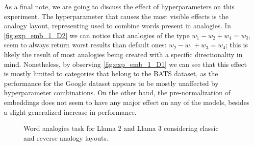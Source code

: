 As a final note, we are going to discuss the effect of hyperparameters on this experiment.
The hyperparameter that causes the most visible effects is the analogy layout, representing  used to combine words present in analogies.
In \cref{fig:exp_emb_1_D2} we can notice that analogies of the type $w_1 - w_2 + w_4 = w_3$, seem to always return worst results than default ones: $w_2 - w_1 + w_3 = w_4$; this is likely the result of most analogies being created with a specific directionality in mind.
Nonetheless, by observing \cref{fig:exp_emb_1_D1} we can see that this effect is mostly limited to categories that belong to the BATS dataset, as the performance for the Google dataset appears to be mostly unaffected by hyperparameter combinations.
On the other hand, the pre-normalization of embeddings does not seem to have any major effect on any of the models, besides a slight generalized increase in performance.

\begin{figure}[t!]
    \centering
    \quad
    \caption{Word analogies task for Llama 2 and Llama 3 considering classic and reverse analogy layouts.}
    \label{fig:exp_emb_1_D}
\end{figure}

